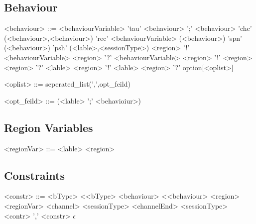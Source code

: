 \documentclass[12pt]{article}
\begin{document}
\subsection{Behaviour}

\begin{grammar}

<behaviour> ::= <behaviourVariable>
\alt 'tau'
\alt <behaviour> ';' <behaviour>
\alt 'chc' (<behaviour>,<behaviour>)
\alt 'rec' <behaviourVariable> (<behaviour>)
\alt 'spn' (<behaviour>)
\alt 'psh' (<lable>,<sessionType>)
\alt <region> '!' <behaviourVariable>
\alt <region> '?' <behaviourVariable>
\alt <region> '!' <region>
\alt <region> '?' <lable>
\alt <region> '!' <lable>
\alt <region> '?' option[<oplist>]

<oplist> ::= seperated_list(',',opt_feild)

<opt_feild> ::= (<lable> ';' <behavioiur>)

\end{grammar}

\subsection {Region Variables}

\begin{grammar}

<regionVar> ::= <lable>
\alt <region>

\end{grammar}

\subsection{Constraints}

\begin{grammar}

<constr> ::= <bType> \textless <bType>
\alt <behaviour> \textless <behaviour>
\alt <region> \texttildelow <regionVar>
\alt <channel> \texttildelow <sessionType>
\alt <channelEnd> \texttildelow <sessionType>
\alt <contr> ',' <constr>
\alt $\epsilon$

\end{grammar}


\end{document}
